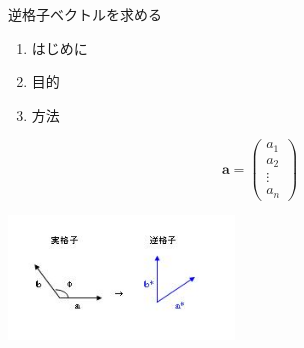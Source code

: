 \documentclass{jarticle}
\begin{document}
{\Huge
 逆格子ベクトルを求める}
\begin{enumerate}
\item はじめに
\item 目的
\item 方法
\end{enumerate}

\begin{equation*}
  \bm{a} = \left(
    \begin{array}{c}
      a_1\\
      a_2\\
      \vdots \\
      a_n
    \end{array}
  \right)
\end{equation*}

\begin{center}
\includegraphics[width=6cm]{lattice.jpg}
\end{center}
\end{document}
